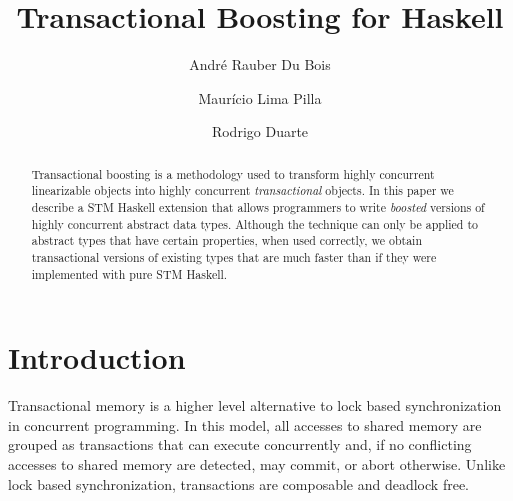 \documentclass{llncs}
\begin{document}
\title{Transactional Boosting for Haskell}

\author{Andr\'e Rauber Du Bois \and  Maur\'icio Lima Pilla \and Rodrigo Duarte }

\maketitle
\begin{abstract}
Transactional boosting is a methodology used to transform highly
concurrent linearizable objects into highly concurrent {\it transactional}
objects. 
In this paper we describe a STM Haskell extension that
allows programmers to write {\it boosted} versions
of highly concurrent abstract data types. Although the technique 
can only be applied to abstract types that have certain properties, when used correctly, we
obtain transactional versions of existing types that are much
faster than if they were implemented with pure STM Haskell.

\end{abstract}


\section{Introduction}

Transactional memory is a higher level alternative to
lock based synchronization in concurrent programming.
In this model, all accesses to shared memory are grouped
as transactions that can execute concurrently and, if no conflicting accesses to shared memory
are detected, may commit, or abort otherwise. 
Unlike lock based synchronization, transactions are composable and
dead\-lock free. 
\end{document}
